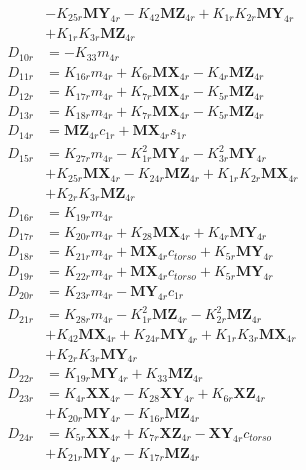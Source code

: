 \begin{multicols}{2}
\begin{align}
&- K_{25r}\mathbf{MY}_{4r} - K_{42}\mathbf{MZ}_{4r} + K_{1r}K_{2r}\mathbf{MY}_{4r}  \nonumber \\
&+ K_{1r}K_{3r}\mathbf{MZ}_{4r} \nonumber \\
D_{10r} &= -K_{33}m_{4r} \nonumber \\
D_{11r} &= K_{16r}m_{4r} + K_{6r}\mathbf{MX}_{4r} - K_{4r}\mathbf{MZ}_{4r} \nonumber \\
D_{12r} &= K_{17r}m_{4r} + K_{7r}\mathbf{MX}_{4r} - K_{5r}\mathbf{MZ}_{4r} \nonumber \\
D_{13r} &= K_{18r}m_{4r} + K_{7r}\mathbf{MX}_{4r} - K_{5r}\mathbf{MZ}_{4r} \nonumber \\
D_{14r} &= \mathbf{MZ}_{4r}c_{1r} + \mathbf{MX}_{4r}s_{1r} \nonumber \\
D_{15r} &= K_{27r}m_{4r} - K_{1r}^2\mathbf{MY}_{4r} - K_{3r}^2\mathbf{MY}_{4r}  \nonumber \\
&+ K_{25r}\mathbf{MX}_{4r} - K_{24r}\mathbf{MZ}_{4r} + K_{1r}K_{2r}\mathbf{MX}_{4r}  \nonumber \\
&+ K_{2r}K_{3r}\mathbf{MZ}_{4r} \nonumber \\
D_{16r} &= K_{19r}m_{4r} \nonumber \\
D_{17r} &= K_{20r}m_{4r} + K_{28}\mathbf{MX}_{4r} + K_{4r}\mathbf{MY}_{4r} \nonumber \\
D_{18r} &= K_{21r}m_{4r} + \mathbf{MX}_{4r}c_{torso} + K_{5r}\mathbf{MY}_{4r} \nonumber \\
D_{19r} &= K_{22r}m_{4r} + \mathbf{MX}_{4r}c_{torso} + K_{5r}\mathbf{MY}_{4r} \nonumber \\
D_{20r} &= K_{23r}m_{4r} - \mathbf{MY}_{4r}c_{1r} \nonumber \\
D_{21r} &= K_{28r}m_{4r} - K_{1r}^2\mathbf{MZ}_{4r} - K_{2r}^2\mathbf{MZ}_{4r}  \nonumber \\
&+ K_{42}\mathbf{MX}_{4r} + K_{24r}\mathbf{MY}_{4r} + K_{1r}K_{3r}\mathbf{MX}_{4r}  \nonumber \\
&+ K_{2r}K_{3r}\mathbf{MY}_{4r} \nonumber \\
D_{22r} &= K_{19r}\mathbf{MY}_{4r} + K_{33}\mathbf{MZ}_{4r} \nonumber \\
D_{23r} &= K_{4r}\mathbf{XX}_{4r} - K_{28}\mathbf{XY}_{4r} + K_{6r}\mathbf{XZ}_{4r}  \nonumber \\
&+ K_{20r}\mathbf{MY}_{4r} - K_{16r}\mathbf{MZ}_{4r} \nonumber \\
D_{24r} &= K_{5r}\mathbf{XX}_{4r} + K_{7r}\mathbf{XZ}_{4r} - \mathbf{XY}_{4r}c_{torso}  \nonumber \\
&+ K_{21r}\mathbf{MY}_{4r} - K_{17r}\mathbf{MZ}_{4r} \nonumber \\

\end{align}
\end{multicols}
